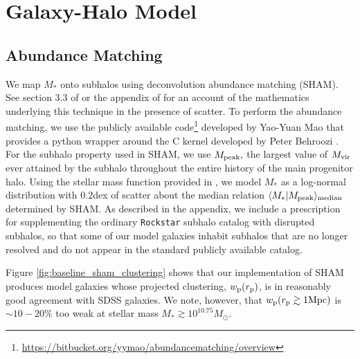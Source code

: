 \documentclass[usenatbib,usegraphicx,letterpaper]{mn2e}
\newcommand{\mstar}{M_{\ast}}
\newcommand{\mvir}{M_{\rm vir}}
\newcommand{\mpeak}{M_{\rm peak}}
\newcommand{\rproj}{r_{\rm p}}
\newcommand{\wproj}{w_{\rm p}}
\newcommand{\median}[2]{\langle{#1}\vert{#2}\rangle_{\rm median}}
\newcommand{\msun}{M_\odot}
\begin{document}
\section{Galaxy-Halo Model}
\label{sec:model}

\subsection{Abundance Matching}
\label{subsec:sham}

We map $\mstar$ onto subhalos using deconvolution abundance matching (SHAM). See section 3.3 of \citet{behroozi_etal10} or the appendix of \citet{kravtsov_etal14} for an account of the mathematics underlying this technique in the presence of scatter. To perform the abundance matching, we use the publicly available code\footnote{\url{https://bitbucket.org/yymao/abundancematching/overview}} developed by Yao-Yuan Mao \citep{lehmann_etal15} that provides a python wrapper around the C kernel developed by Peter Behroozi \citep{behroozi_etal10}. For the subhalo property used in SHAM, we use $\mpeak,$ the largest value of $\mvir$ ever attained by the subhalo throughout the entire history of the main progenitor halo.  Using the stellar mass function provided in \citet{moustakas_etal13}, we model $\mstar$ as a log-normal distribution with $0.2$dex of scatter about the median relation $\median{\mstar}{\mpeak}$ determined by SHAM. As described in the appendix, we include a prescription for supplementing the ordinary {\tt Rockstar} subhalo catalog with disrupted subhalos, so that some of our model galaxies inhabit subhalos that are no longer resolved and do not appear in the standard publicly available catalog.

Figure \ref{fig:baseline_sham_clustering} shows that our implementation of SHAM produces model galaxies whose projected clustering, $\wproj(\rproj)$, is in reasonably good agreement with SDSS galaxies. We note, however, that $\wproj(\rproj\gtrsim1{\rm Mpc})$ is $\sim10-20\%$ too weak at stellar mass $\mstar\gtrsim10^{10.75}\msun.$
\end{document}
